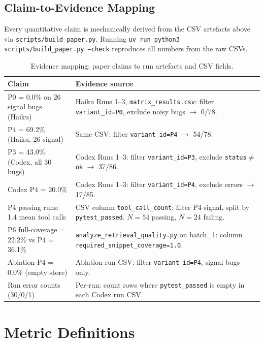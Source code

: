 \documentclass[10pt,a4paper,twocolumn]{article}
\begin{document}
\subsection*{Claim-to-Evidence Mapping}

Every quantitative claim is mechanically derived from the CSV artefacts
above via \texttt{scripts/build\_paper.py}.
Running \texttt{uv run python3 scripts/build\_paper.py --check}
reproduces all numbers from the raw CSVs.

\begin{table}[H]
\centering
\caption{Evidence mapping: paper claims to run artefacts and CSV fields.}
\label{tab:evidence}
\footnotesize
\begin{tabular}{@{}p{4cm}p{5.5cm}@{}}
\toprule
\textbf{Claim} & \textbf{Evidence source} \\
\midrule
P0 = 0.0\% on 26 signal bugs (Haiku) &
    Haiku Runs 1--3, \texttt{matrix\_results.csv}: filter
    \texttt{variant\_id=P0}, exclude noisy bugs $\to$ 0/78. \\
P4 = 69.2\% (Haiku, 26 signal) &
    Same CSV: filter \texttt{variant\_id=P4} $\to$ 54/78. \\
P3 = 43.0\% (Codex, all 30 bugs) &
    Codex Runs 1--3: filter \texttt{variant\_id=P3},
    exclude \texttt{status$\neq$ok} $\to$ 37/86. \\
Codex P4 = 20.0\% &
    Codex Runs 1--3: filter \texttt{variant\_id=P4},
    exclude errors $\to$ 17/85. \\
P4 passing runs: 1.4 mean tool calls &
    CSV column \texttt{tool\_call\_count}: filter P4 signal,
    split by \texttt{pytest\_passed}. $N{=}54$ passing,
    $N{=}24$ failing. \\
P6 full-coverage = 22.2\% vs P4 = 36.1\% &
    \texttt{analyze\_retrieval\_quality.py} on batch\_1:
    column \texttt{required\_snippet\_coverage=1.0}. \\
Ablation P4 = 0.0\% (empty store) &
    Ablation run CSV: filter \texttt{variant\_id=P4},
    signal bugs only. \\
Run error counts (30/0/1) &
    Per-run: count rows where \texttt{pytest\_passed} is empty
    in each Codex run CSV. \\
\bottomrule
\end{tabular}
\end{table}

\section{Metric Definitions}
\label{app:metrics}
\end{document}
